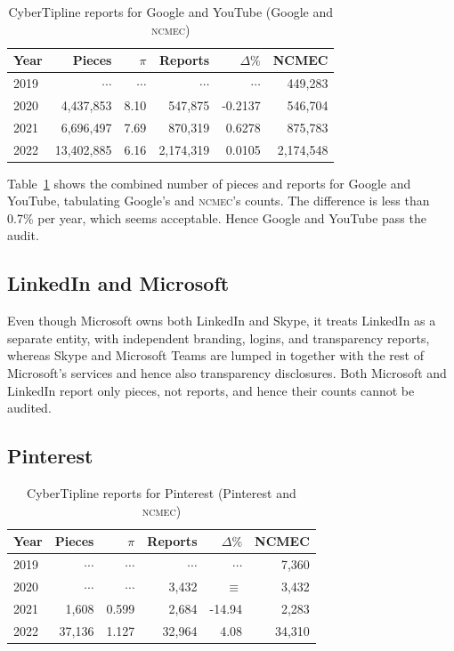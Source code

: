 \documentclass[nonacm,screen]{acmart}
\newcommand\V[1]{\textsc{\MakeLowercase{#1}}}
\begin{document}
\begin{itemize}
{\begin{table}[h!]
\centering\libertineLF
\caption{CyberTipline reports for Google and YouTube (Google and \V{NCMEC})}
\label{tab:alphabet}
\begin{tabular}{l|rr|rrr}
\textbf{Year}
& \textbf{Pieces} & \textbf{$\pi$} & \textbf{Reports}
& \textbf{$\Delta\%$} & \textbf{NCMEC} \\ \hline
2019 & $\cdots$ & $\cdots$ & $\cdots$ & $\cdots$ & 449,283 \\
2020 & 4,437,853 & 8.10 & 547,875 & -0.2137 & 546,704 \\
2021 & 6,696,497 & 7.69 & 870,319 & 0.6278 & 875,783 \\
2022 & 13,402,885 & 6.16 & 2,174,319 & 0.0105 & 2,174,548 \\
\end{tabular}
\end{table}

\noindent{}Table~\ref{tab:alphabet} shows the combined number of pieces and
reports for Google and YouTube, tabulating Google's and \V{NCMEC}'s counts. The
difference is less than 0.7\% per year, which seems acceptable. Hence Google and
YouTube pass the audit.


\subsection{LinkedIn and Microsoft}

\noindent{}Even though Microsoft owns both LinkedIn and Skype, it treats
LinkedIn as a separate entity, with independent branding, logins, and
transparency reports, whereas Skype and Microsoft Teams are lumped in together
with the rest of Microsoft's services and hence also transparency disclosures.
Both Microsoft and LinkedIn report only pieces, not reports, and hence their
counts cannot be audited.


\subsection{Pinterest}

\begin{table}[h!]
\centering\libertineLF
\caption{CyberTipline reports for Pinterest (Pinterest and \V{NCMEC})}
\label{tab:pinterest}
\begin{tabular}{l|rr|rrr}
\textbf{Year}
& \textbf{Pieces} & \textbf{$\pi$} & \textbf{Reports}
& \textbf{$\Delta\%$} & \textbf{NCMEC} \\ \hline
2019 & $\cdots$ & $\cdots$ & $\cdots$ & $\cdots$ & 7,360 \\
2020 & $\cdots$ & $\cdots$ & 3,432 & $\equiv$ & 3,432 \\
2021 & 1,608 & 0.599 & 2,684 & -14.94 & 2,283 \\
2022 & 37,136 & 1.127 & 32,964 & 4.08 & 34,310 \\
\end{tabular}
\end{table}

}
\end{itemize}
\end{document}
